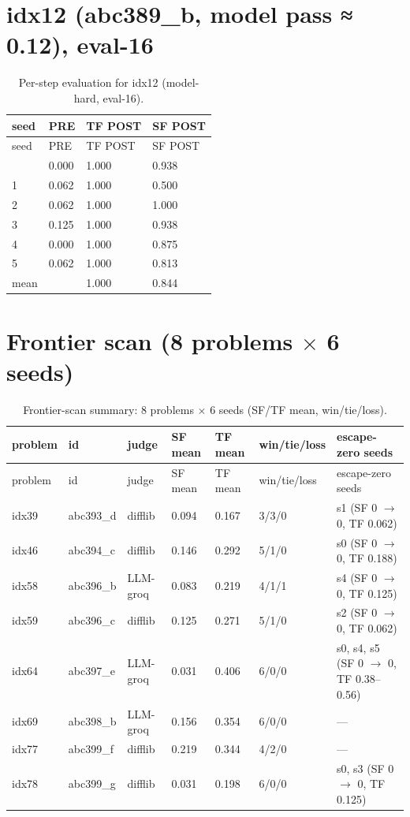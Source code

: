 \section{idx12 (abc389\_b, model pass ≈ 0.12), eval-16}\label{e.2-idx12-abc389_b-model-hard-model-pass-0.12-eval-16}

\begin{longtable}{llll}
\caption{Per-step evaluation for idx12 (model-hard, eval-16).}\\
\toprule
seed & PRE & TF POST & SF POST \\
\midrule
\endfirsthead
\toprule
seed & PRE & TF POST & SF POST \\
\midrule
\endhead
\bottomrule
\endfoot
0 & 0.000 & 1.000 & 0.938 \\
1 & 0.062 & 1.000 & 0.500 \\
2 & 0.062 & 1.000 & 1.000 \\
3 & 0.125 & 1.000 & 0.938 \\
4 & 0.000 & 1.000 & 0.875 \\
5 & 0.062 & 1.000 & 0.813 \\
mean & & 1.000 & 0.844 \\
\end{longtable}

\section{Frontier scan (8 problems $\times$ 6 seeds)}\label{e.3-frontier-scan-comprehensive-evaluations}

\begingroup\setlength{\tabcolsep}{3.5pt}
\begin{longtable}{llllll p{4.2cm}}
\caption{Frontier-scan summary: 8 problems $\times$ 6 seeds (SF/TF mean, win/tie/loss).}\\
\toprule
problem & id & judge & SF mean & TF mean & win/tie/loss & escape-zero seeds \\
\midrule
\endfirsthead
\toprule
problem & id & judge & SF mean & TF mean & win/tie/loss & escape-zero seeds \\
\midrule
\endhead
\bottomrule
\endfoot
idx39 & abc393\_d & difflib & 0.094 & 0.167 & 3/3/0 & s1 (SF 0 $\rightarrow$ 0, TF 0.062) \\
idx46 & abc394\_c & difflib & 0.146 & 0.292 & 5/1/0 & s0 (SF 0 $\rightarrow$ 0, TF 0.188) \\
idx58 & abc396\_b & LLM-groq & 0.083 & 0.219 & 4/1/1 & s4 (SF 0 $\rightarrow$ 0, TF 0.125) \\
idx59 & abc396\_c & difflib & 0.125 & 0.271 & 5/1/0 & s2 (SF 0 $\rightarrow$ 0, TF 0.062) \\
idx64 & abc397\_e & LLM-groq & 0.031 & 0.406 & 6/0/0 & s0, s4, s5 (SF 0 $\rightarrow$ 0, TF 0.38--0.56) \\
idx69 & abc398\_b & LLM-groq & 0.156 & 0.354 & 6/0/0 & --- \\
idx77 & abc399\_f & difflib & 0.219 & 0.344 & 4/2/0 & --- \\
idx78 & abc399\_g & difflib & 0.031 & 0.198 & 6/0/0 & s0, s3 (SF 0 $\rightarrow$ 0, TF 0.125) \\
\end{longtable}\endgroup

